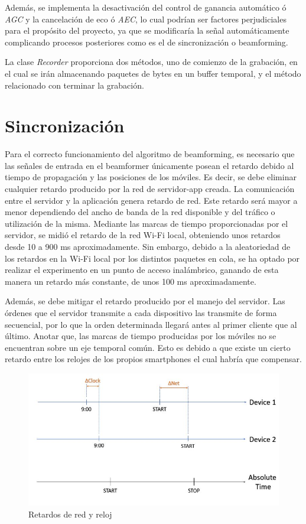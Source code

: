 \documentclass[a4paper,11pt]{book}
\begin{document}
\begin{itemize}
	Además, se implementa la desactivación del control de ganancia automático ó \textit{AGC} y la cancelación de eco ó \textit{AEC}, lo cual podrían ser factores perjudiciales para el propósito del proyecto, ya que se modificaría la señal automáticamente complicando procesos posteriores como es el de sincronización o beamforming.
	
	La clase \textit{Recorder} proporciona dos métodos, uno de comienzo de la grabación, en el cual se irán almacenando paquetes de bytes en un buffer temporal, y el método relacionado con terminar la grabación.
	\end{itemize}
	
	
	
\chapter{Sincronización}

Para el correcto funcionamiento del algoritmo de beamforming, es necesario que las señales de entrada en el beamformer únicamente posean el retardo debido al tiempo de propagación y las posiciones de los móviles. Es decir, se debe eliminar cualquier retardo producido por la red de servidor-app creada. La comunicación entre el servidor y la aplicación genera retardo de red. Este retardo será mayor a menor dependiendo del ancho de banda de la red disponible y del tráfico o utilización de la misma. Mediante las marcas de tiempo proporcionadas por el servidor, se midió el retardo de la red Wi-Fi local, obteniendo unos retardos desde 10 a 900 ms aproximadamente. Sin embargo, debido a la aleatoriedad de los retardos en la Wi-Fi local por los distintos paquetes en cola, se ha optado por realizar el experimento en un punto de acceso inalámbrico, ganando de esta manera un retardo más constante, de unos 100 ms aproximadamente.


Además, se debe mitigar el retardo producido por el manejo del servidor. Las órdenes que el servidor transmite a cada dispositivo las transmite de forma secuencial, por lo que la orden determinada llegará antes al primer cliente que al último. Anotar que, las marcas de tiempo producidas por los móviles no se encuentran sobre un eje temporal común. Esto es debido a que existe un cierto retardo entre los relojes de los propios smartphones el cual habría que compensar.

\begin{figure}[hbtp]
\centering
\includegraphics[width = 12cm]{FIGURAS/ejes_temporales.JPG}
\caption{Retardos de red y reloj}
\end{figure}
\end{document}
